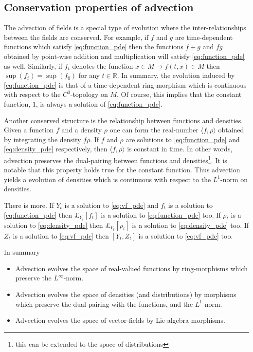 \documentclass[12pt]{amsart}
\begin{document}
\subsection{Conservation properties of advection}
The advection of fields is a special type of evolution where the inter-relationships between the fields are conserved.
For example, if $f$ and $g$ are time-dependent functions which satisfy \eqref{eq:function_pde} then the functions $f+g$ and $fg$
obtained by point-wise addition and multiplication will satisfy \eqref{eq:function_pde} as well.
Similarly, if $f_t$ denotes the function $x \in M \to f(t,x) \in M$ then $\sup(f_t) = \sup(f_0)$ for any $t \in \mathbb{R}$.
In summary, the evolution induced by \eqref{eq:function_pde} is that of a time-dependent ring-morphism which is continuous with respect to 
the $C^0$-topology on $M$.
Of course, this implies that the constant function, $1$, is always a solution of \eqref{eq:function_pde}.

Another conserved structure is the relationship between functions and densities.  Given a function $f$ and a density $\rho$
one can form the real-number $\langle f, \rho \rangle$ obtained by integrating the density $f \rho$.
If $f$ and $\rho$ are solutions to \eqref{eq:function_pde} and \eqref{eq:density_pde} respectively, then $\langle f , \rho \rangle$ is constant in time.
In other words, advection preserves the dual-pairing between functions and densities\footnote{this can be extended to the space of distributions}.
It is notable that this property holds true for the constant function.
Thus advection yields a evolution of densities which is continuous with respect to the $L^1$-norm on densities. 

There is more.
If $Y_t$ is a solution to \eqref{eq:vf_pde} and $f_t$ is a solution to \eqref{eq:function_pde} then $\pounds_{Y_t}[f_t]$ is a solution to \eqref{eq:function_pde} too.
If $\rho_t$ is a solution to \eqref{eq:density_pde} then $\pounds_{Y_t}[ \rho_t]$ is a solution to \eqref{eq:density_pde} too.
If $Z_t$ is a solution to \eqref{eq:vf_pde} then $[Y_t,Z_t]$ is a solution to \eqref{eq:vf_pde} too.

In summary
\begin{itemize}
	\item Advection evolves the space of real-valued functions by ring-morphisms which preserve the $L^\infty$-norm.
	\item Advection evolves the space of densities (and distributions) by morphisms which preserve the dual pairing with 
		the functions, and the $L^1$-norm.
	\item Advection evolves the space of vector-fields by Lie-algebra morphisms.
\end{itemize}
\end{document}
